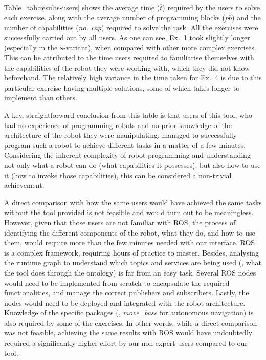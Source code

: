 Table~\ref{tab:results-users} shows the average time ($\overline{t}$) required by the users to solve each exercise, along with the average number of programming blocks ($\overline{pb}$) and the number of capabilities (\textit{no. cap}) required to solve the task. All the exercises were successfully carried out by all users. As one can see, Ex.~1 took slightly longer (especially in the \texttt{s}-variant), when compared with other more complex exercises. This can be attributed to the time users required to familiarise themselves with the capabilities of the robot they were working with, which they did not know beforehand. The relatively high variance in the time taken for Ex.~4 is due to this particular exercise having multiple solutions, some of which takes longer to implement than others. 

A key, straightforward conclusion from this table is that users of this tool, who had no experience of programming robots and no prior knowledge of the architecture of the robot they were manipulating, managed to successfully program such a robot to achieve different tasks in a matter of a few minutes. Considering the inherent complexity of robot programming and understanding not only what a robot can do (what capabilities it possesses), but also how to use it (how to invoke those capabilities), this can be considered a non-trivial achievement. 

A direct comparison with how the same users would have achieved the same tasks without the tool provided is not feasible and would turn out to be meaningless. However, given that those users are not familiar with ROS,  the process of identifying the different components of the robot, what they do, and how to use them, would require more than the few minutes needed with our interface. ROS is a complex framework, requiring hours of practice to master. Besides, analysing the runtime graph to understand which topics and services are being used (\ie, what the tool does through the ontology) is far from an easy task. Several ROS nodes would need to be implemented from scratch to encapsulate the required functionalities, and manage the correct publishers and subscribers. Lastly, the nodes would need to be deployed and integrated with the robot architecture. Knowledge of the specific packages (\eg, \textit{move\_base} for autonomous navigation) is also required by some of the exercises. In other words, while a direct comparison was not feasible, achieving the same results with ROS would have undoubtedly required a significantly higher effort by our non-expert users compared to our tool.

